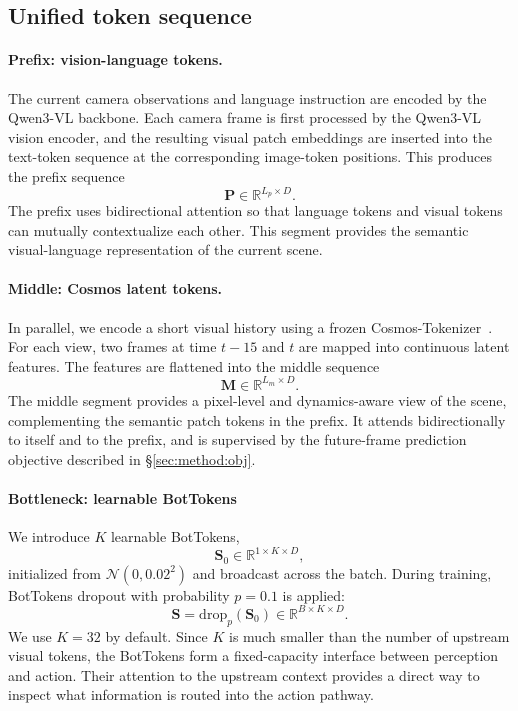 \documentclass[a4paper,table]{extarticle}
\begin{document}
\subsection{Unified token sequence}
\label{sec:method:seq}

\paragraph{Prefix: vision-language tokens.}
The current camera observations and language instruction are encoded by the Qwen3-VL backbone. Each camera frame is first processed by the Qwen3-VL vision encoder, and the resulting visual patch embeddings are inserted into the text-token sequence at the corresponding image-token positions. This produces the prefix sequence
\begin{equation}
\mathbf P \in \mathbb{R}^{L_p \times D}.
\end{equation}
The prefix uses bidirectional attention so that language tokens and visual tokens can mutually contextualize each other. This segment provides the semantic visual-language representation of the current scene.

\paragraph{Middle: Cosmos latent tokens.}
In parallel, we encode a short visual history using a frozen Cosmos-Tokenizer~\cite{cosmos-world_2025}. For each view, two frames at time $t{-}15$ and $t$ are mapped into continuous latent features. The features are flattened into the middle sequence
\begin{equation}
\mathbf M \in \mathbb{R}^{L_m \times D}.
\end{equation}
The middle segment provides a pixel-level and dynamics-aware view of the scene, complementing the semantic patch tokens in the prefix. It attends bidirectionally to itself and to the prefix, and is supervised by the future-frame prediction objective described in \S\ref{sec:method:obj}.

\paragraph{Bottleneck: learnable BotTokens}
We introduce $K$ learnable BotTokens,
\begin{equation}
\mathbf S_0 \in \mathbb{R}^{1 \times K \times D},
\end{equation}
initialized from $\mathcal N(0,0.02^2)$ and broadcast across the batch. During training, BotTokens dropout with probability $p=0.1$ is applied:
\begin{equation}
\mathbf S = \mathrm{drop}_p(\mathbf S_0) \in \mathbb{R}^{B \times K \times D}.
\end{equation}
We use $K=32$ by default. Since $K$ is much smaller than the number of upstream visual tokens, the BotTokens form a fixed-capacity interface between perception and action. Their attention to the upstream context provides a direct way to inspect what information is routed into the action pathway.
\end{document}
